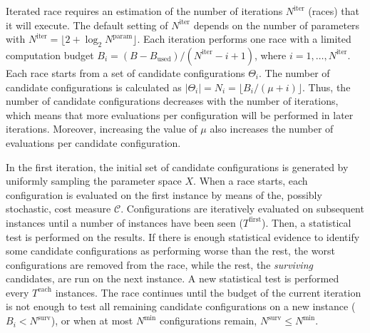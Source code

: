 \documentclass[a4paper]{article}
\newcommand{\assign}{\ensuremath{:=}}
\newcommand{\procedure}[1]{\textsf{#1}}
\newcommand{\iter}{\ensuremath{i}\xspace}
\newcommand{\Budget}{\ensuremath{B}\xspace}
\newcommand{\Budgeti}{\ensuremath{\Budget_{\iter}}\xspace}
\newcommand{\Bused}{\ensuremath{\Budget_\text{used}}\xspace}
\newcommand{\Ncand}[1][]{\ensuremath{N_{#1}}\xspace}
\newcommand{\Nparam}{\ensuremath{{N^\text{param}}}\xspace}
\newcommand{\Niter}{\ensuremath{N^\text{iter}}\xspace}
\newcommand{\Nmin}{\ensuremath{N^\text{min}}\xspace}
\newcommand{\Nsurv}{\ensuremath{N^\text{surv}}\xspace}
\newcommand{\Celite}{\ensuremath{\Theta^\text{elite}}\xspace}
\newcommand{\parameter}[1]{\hyperlink{opt:#1}{\texttt{#1}}}
\begin{document}

Iterated race requires an estimation of the number of iterations
$\Niter$ (races) that it will execute. The default setting of $\Niter$
depends on the number of parameters with $\Niter = \lfloor 2 +
\log_{2}\Nparam \rfloor$. Each iteration performs one race with a
limited computation budget $\Budgeti = (\Budget - \Bused) / (\Niter -
\iter + 1)$, where $\iter = 1, \dotsc, \Niter$. Each race starts from
a set of candidate configurations $\Theta_\iter$. The number of
candidate configurations is calculated as $|\Theta_\iter|= \Ncand[\iter] =
\lfloor \Budgeti / (\mu + \iter)\rfloor$. Thus, the number of
candidate configurations decreases with the number of iterations,
which means that more evaluations per configuration will be performed
in later iterations. Moreover, increasing the value of $\mu$ also
increases the number of evaluations per candidate configuration. 

\newcommand{\Tfirst}{\ensuremath{T^\text{first}}\xspace}
\newcommand{\Teach}{\ensuremath{T^\text{each}}\xspace}

In the first iteration, the initial set of candidate configurations is
generated by uniformly sampling the parameter space $X$. When a race
starts, each configuration is evaluated on the first instance by means of
the, possibly stochastic, cost measure $\mathcal{C}$. Configurations
are iteratively evaluated on subsequent instances until a number of
instances have been seen ($\Tfirst$). Then, a statistical
test is performed on the results. If there is enough statistical
evidence to identify some candidate configurations as performing worse
than the rest, the worst configurations are removed from the
race, while the rest, the \emph{surviving} candidates, are run on the
next instance. A new statistical test is performed every $\Teach$
instances.
%
The race continues until the budget of the current iteration is not enough to
test all remaining candidate configurations on a new instance
($\Budgeti < \Nsurv$), or when at most $\Nmin$ configurations remain,
$\Nsurv \leq \Nmin$. 
\end{document}
